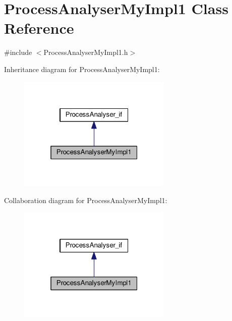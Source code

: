 \hypertarget{class_process_analyser_my_impl1}{\section{Process\-Analyser\-My\-Impl1 Class Reference}
\label{class_process_analyser_my_impl1}
}


{\ttfamily \#include $<$Process\-Analyser\-My\-Impl1.\-h$>$}



Inheritance diagram for Process\-Analyser\-My\-Impl1\-:\nopagebreak
\begin{figure}[H]
\begin{center}
\leavevmode
\includegraphics[width=208pt]{class_process_analyser_my_impl1__inherit__graph}
\end{center}
\end{figure}


Collaboration diagram for Process\-Analyser\-My\-Impl1\-:\nopagebreak
\begin{figure}[H]
\begin{center}
\leavevmode
\includegraphics[width=208pt]{class_process_analyser_my_impl1__coll__graph}
\end{center}
\end{figure}
